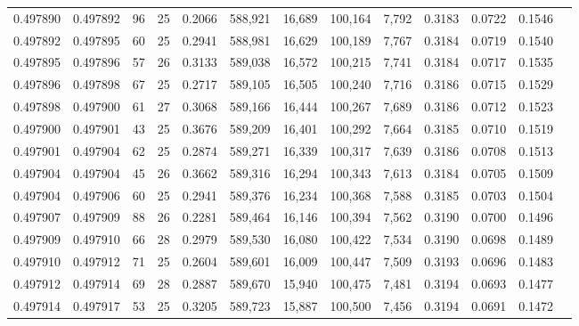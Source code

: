 \begin{tabular}{rrrrrrrrrrrrr}
0.497890 & 0.497892 &  96 &  25 &                                     0.2066 & 588,921 &  16,689 & 100,164 &   7,792 & 0.3183 & 0.0722 & 0.1546 \\
0.497892 & 0.497895 &  60 &  25 &                                     0.2941 & 588,981 &  16,629 & 100,189 &   7,767 & 0.3184 & 0.0719 & 0.1540 \\
0.497895 & 0.497896 &  57 &  26 &                                     0.3133 & 589,038 &  16,572 & 100,215 &   7,741 & 0.3184 & 0.0717 & 0.1535 \\
0.497896 & 0.497898 &  67 &  25 &                                     0.2717 & 589,105 &  16,505 & 100,240 &   7,716 & 0.3186 & 0.0715 & 0.1529 \\
0.497898 & 0.497900 &  61 &  27 &                                     0.3068 & 589,166 &  16,444 & 100,267 &   7,689 & 0.3186 & 0.0712 & 0.1523 \\
0.497900 & 0.497901 &  43 &  25 &                                     0.3676 & 589,209 &  16,401 & 100,292 &   7,664 & 0.3185 & 0.0710 & 0.1519 \\
0.497901 & 0.497904 &  62 &  25 &                                     0.2874 & 589,271 &  16,339 & 100,317 &   7,639 & 0.3186 & 0.0708 & 0.1513 \\
0.497904 & 0.497904 &  45 &  26 &                                     0.3662 & 589,316 &  16,294 & 100,343 &   7,613 & 0.3184 & 0.0705 & 0.1509 \\
0.497904 & 0.497906 &  60 &  25 &                                     0.2941 & 589,376 &  16,234 & 100,368 &   7,588 & 0.3185 & 0.0703 & 0.1504 \\
0.497907 & 0.497909 &  88 &  26 &                                     0.2281 & 589,464 &  16,146 & 100,394 &   7,562 & 0.3190 & 0.0700 & 0.1496 \\
0.497909 & 0.497910 &  66 &  28 &                                     0.2979 & 589,530 &  16,080 & 100,422 &   7,534 & 0.3190 & 0.0698 & 0.1489 \\
0.497910 & 0.497912 &  71 &  25 &                                     0.2604 & 589,601 &  16,009 & 100,447 &   7,509 & 0.3193 & 0.0696 & 0.1483 \\
0.497912 & 0.497914 &  69 &  28 &                                     0.2887 & 589,670 &  15,940 & 100,475 &   7,481 & 0.3194 & 0.0693 & 0.1477 \\
0.497914 & 0.497917 &  53 &  25 &                                     0.3205 & 589,723 &  15,887 & 100,500 &   7,456 & 0.3194 & 0.0691 & 0.1472 \\

\end{tabular}
